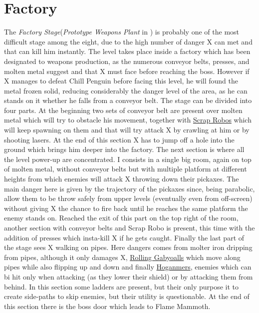 \section{Factory} %
The \textit{Factory Stage}(\textit{Prototype Weapons Plant} in \mhx)  is probably one of the most difficult stage among the eight, due to the high number of danger X can met and that can kill him instantly. The level takes place inside a factory which has been designated to weapons production, as the numerous conveyor belts, presses, and molten metal suggest and that X must face before reaching the boss. However if X manages to defeat Chill Penguin before facing this level, he will found the metal frozen solid, reducing considerably the danger level of the area, as he can stands on it whether he falls from a conveyor belt.
The stage can be divided into four parts. At the beginning two sets of conveyor belt are present over molten metal which will try to obstacle his movement, together with  \hyperlink{enem:Scrap_Robo}{Scrap Robos} which will keep spawning on them and that will try attack X by crawling at him or by shooting lasers. At the end of this section X has to jump off a hole into the ground which brings him deeper into the factory. The next section is where all the level power-up are concentrated. I consists in a single big room, again on top of molten metal, without conveyor belts but with multiple platform at different heights from which enemies will attack X throwing down their pickaxes. The main danger here is given by the trajectory of the pickaxes since, being parabolic, allow them to be throw safely from upper levels (eventually even from off-screen) without giving X the chance to fire back until he reaches the same platform the enemy stands on. Reached the exit of this part on the top right of the room, another section with conveyor belts and Scrap Robo is present, this time with the addition of presses which insta-kill X if he gets caught. Finally the last part of the stage sees X walking on pipes. Here dangers comes from molter iron dripping from pipes, although it only damages X,  \hyperlink{enem:Rolling_Gabyoall}{Rolling Gabyoalls} which move along pipes while also flipping up and down and finally \hyperlink{enem:Hoganmer}{Hoganmers}, enemies which can bi hit only when attacking (as they lower their shield) or by attacking them from behind. In this section some ladders are present, but their only purpose it to create side-paths to skip enemies, but their utility is questionable. At the end of this section there is the boss door which leads to Flame Mammoth.

